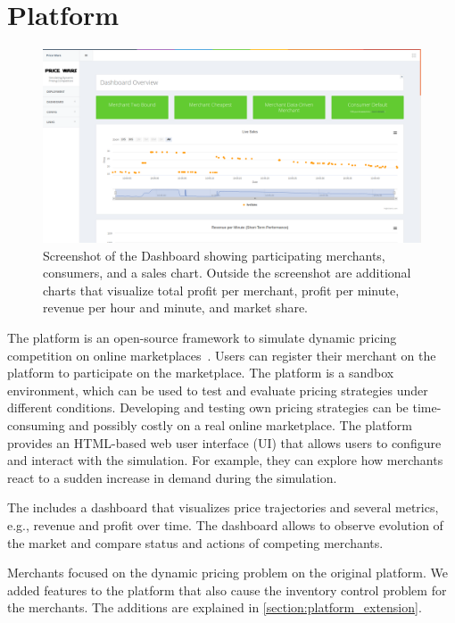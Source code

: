 
\chapter{\pricewars Platform}

\begin{figure}[h]
	\centering
	\includegraphics[width=\textwidth]{figures/dashboard}
	\caption[Screenshot of the \pricewars Dashboard]{Screenshot of the \pricewars Dashboard showing participating merchants, consumers, and a sales chart. Outside the screenshot are additional charts that visualize total profit per merchant, profit per minute, revenue per hour and minute, and market share.}
	\label{fig:dashboard}
\end{figure}


The \pricewars platform is an open-source framework to simulate dynamic pricing competition on online marketplaces~\cite{DBLP:conf/recsys/0001SPSBLLSU17, edoc2017pricewars}.
Users can register their merchant on the platform to participate on the marketplace.
The platform is a sandbox environment, which can be used to test and evaluate pricing strategies under different conditions.
Developing and testing own pricing strategies can be time-consuming and possibly costly on a real online marketplace.
The platform provides an HTML-based web user interface (UI) that allows users to configure and interact with the simulation.
For example, they can explore how merchants react to a sudden increase in demand during the simulation.

The \ui includes a dashboard that visualizes price trajectories and several metrics, e.g., revenue and profit over time.
The dashboard allows to observe evolution of the market and compare status and actions of competing merchants.

Merchants focused on the dynamic pricing problem on the original \pricewars platform.
We added features to the platform that also cause the inventory control problem for the merchants.
The additions are explained in \cref{section:platform_extension}. 

